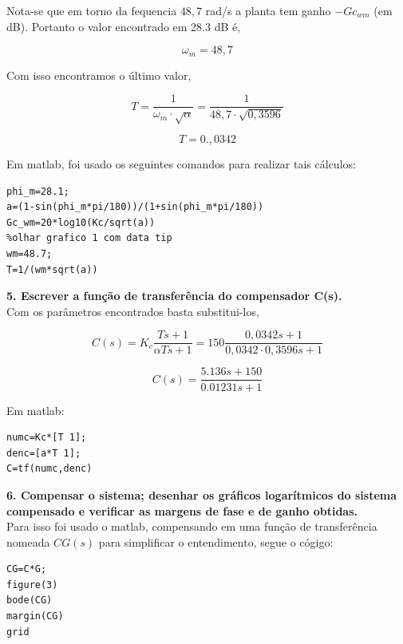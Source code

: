 Nota-se que em torno da fequencia $48,7$ rad/s a planta tem ganho $-Gc_{wm}$ (em dB). Portanto o valor encontrado em 28.3 dB é,

{\color{red} \[ \boxed{\omega_m = 48,7} \]}

Com isso encontramos o último valor, 

\[ T = \dfrac{1}{\omega_m \cdot \sqrt{\alpha}} = \dfrac{1}{48,7\cdot \sqrt{0,3596}}\]

{\color{red} \[ \boxed{T = 0.,0342} \] }

\noindent Em matlab, foi usado os seguintes comandos para realizar tais cálculos:

\begin{lstlisting}[style=matlab]
phi_m=28.1;
a=(1-sin(phi_m*pi/180))/(1+sin(phi_m*pi/180))
Gc_wm=20*log10(Kc/sqrt(a)) 
%olhar grafico 1 com data tip
wm=48.7; 
T=1/(wm*sqrt(a)) 
\end{lstlisting}\vspace{0.2cm}


\noindent \textbf{5. Escrever a função de transferência do compensador C(s).}\\

Com os parâmetros encontrados basta substitui-los,

\[ C(s) = K_c \dfrac{Ts+1}{\alpha T s + 1} = 150\dfrac{0,0342s + 1}{0,0342\cdot 0,3596 s + 1}\]

{\color{red} \[ \boxed{C(s) = \dfrac{5.136 s + 150}{0.01231 s + 1} } \]}

\noindent Em matlab:

\begin{lstlisting}[style=matlab]
numc=Kc*[T 1];
denc=[a*T 1];
C=tf(numc,denc)
\end{lstlisting}\vspace{0.2cm}


\noindent \textbf{6. Compensar o sistema; desenhar os gráficos logarítmicos do sistema compensado e verificar as margens de fase e de ganho obtidas.}\\

Para isso foi usado o matlab, compensando em uma função de transferência nomeada $CG(s)$ para simplificar o entendimento, segue o cógigo:

\begin{lstlisting}[style=matlab]
CG=C*G;
figure(3)
bode(CG)
margin(CG)
grid
\end{lstlisting}\vspace{0.2cm}


